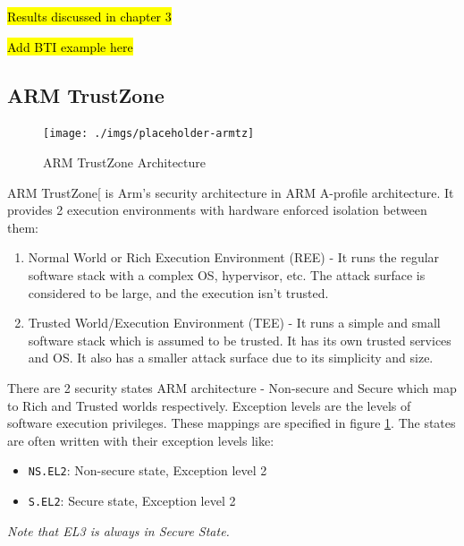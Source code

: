 \documentclass[a4paper, nobind]{templates/ociamthesis}
\providecommand{\tightlist}{%
  \setlength{\itemsep}{0pt}\setlength{\parskip}{0pt}}
\begin{document}
\hl{Results discussed in chapter 3}

\hl{Add BTI example here}

\subsection{ARM TrustZone}\label{arm-trustzone}

\begin{figure}[H]

{\centering \texttt{[image: ./imgs/placeholder-armtz]} 

}

\caption{ARM TrustZone Architecture}\label{fig:armtz-arch}
\end{figure}

ARM TrustZone{[}\citeproc{ref-armtz}{3}{]} is Arm's security architecture in ARM A-profile architecture.
It provides 2 execution environments with hardware enforced isolation between them:

\begin{enumerate}
\def\labelenumi{\arabic{enumi}.}
\tightlist
\item
  Normal World or Rich Execution Environment (REE) - It runs the regular software
  stack with a complex OS, hypervisor, etc. The attack surface is considered to be large,
  and the execution isn't trusted.
\item
  Trusted World/Execution Environment (TEE) - It runs a simple and small software
  stack which is assumed to be trusted. It has its own trusted services and OS.
  It also has a smaller attack surface due to its simplicity and size.
\end{enumerate}

There are 2 security states ARM architecture - Non-secure and Secure which map
to Rich and Trusted worlds respectively.
Exception levels are the levels of software execution privileges.
These mappings are specified in figure \ref{fig:armtz-arch}.
The states are often written with their exception levels like:

\begin{itemize}
\tightlist
\item
  \texttt{NS.EL2}: Non-secure state, Exception level 2
\item
  \texttt{S.EL2}: Secure state, Exception level 2
\end{itemize}

\emph{Note that EL3 is always in Secure State.}
\end{document}
